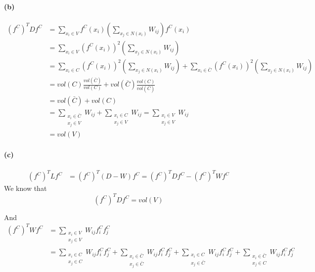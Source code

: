 \documentclass{article}
\begin{document}
\paragraph{(b)}

\begin{equation}
  \begin{split}
    (f^C)^T Df^{C} & = \sum_{x_i \in V} f^{C}(x_i) (\sum_{x_j \in N(x_i)} W_{ij}) f^{C}(x_i)\\
    & = \sum_{x_i \in V} (f^{C}(x_i))^2 (\sum_{x_j \in N(x_i)} W_{ij})\\
    & = \sum_{x_i \in C} (f^{C}(x_i))^2 (\sum_{x_j \in N(x_i)} W_{ij}) +  \sum_{x_i \in \bar{C}} (f^{C}(x_i))^2 (\sum_{x_j \in N(x_i)} W_{ij})\\
    & = vol(C) \frac{vol(\bar{C})}{vol(C)}  + vol(\bar{C})\frac{vol(C)}{vol(\bar{C})} \\
    & = vol(\bar{C}) + vol(C)\\
    & = \sum_{\substack{x_{i} \in \bar{C} \\ x_{j} \in V}} W_{ij} +\sum_{\substack{x_{i} \in C \\ x_{j} \in V}} W_{ij} = \sum_{\substack{x_{i} \in V \\ x_{j} \in V}} W_{ij} \\
    & = vol(V)
\end{split}
\end{equation}

\paragraph{(c)}
\begin{equation}
  \begin{split}
    (f^C)^T Lf^{C} & = (f^C)^T (D-W) f^{C} = (f^C)^T Df^{C} - (f^C)^T Wf^{C}
  \end{split}
\end{equation}
We know that
\begin{equation}
  (f^C)^T Df^{C} = vol(V)
\end{equation}


And
\begin{equation}
  \begin{split}
  (f^C)^T Wf^{C} & = \sum_{\substack{x_{i} \in V \\ x_{j} \in V}} W_{ij} f^{C}_i f^{C}_j  \\
  & = \sum_{\substack{x_{i} \in C \\ x_{j} \in C}} W_{ij} f^{C}_i f^{C}_j + \sum_{\substack{x_{i} \in \bar{C} \\ x_{j} \in \bar{C}}} W_{ij} f^{C}_i f^{C}_j + \sum_{\substack{x_{i} \in C \\ x_{j} \in \bar{C}}} W_{ij} f^{C}_i f^{C}_j + \sum_{\substack{x_{i} \in \bar{C} \\ x_{j} \in C}} W_{ij} f^{C}_i f^{C}_j
  \end{split}
\end{equation}
\end{document}

